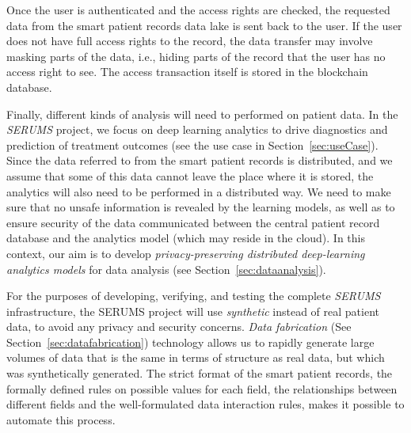 Once the user is authenticated and the access rights are checked, the requested data from the smart patient records data lake is sent back to the user. If the user does not have full access rights to the record, the data transfer may involve masking parts of the data, i.e., hiding parts of the record that the user has no access right to see. The access transaction itself is stored in the blockchain database.

Finally, different kinds of analysis will need to performed on patient data. In the \emph{SERUMS} project, we focus on deep learning analytics to drive diagnostics and prediction of treatment outcomes (see the use case in Section~\ref{sec:useCase}). Since the data referred to from the smart patient records is distributed, and we assume that some of this data cannot leave the place where it is stored, the analytics will also need to be performed in a distributed way. We need to make sure that no unsafe information is revealed by the learning models, as well as to ensure security of the data communicated between the central patient record database and the analytics model (which may reside in the cloud). In this context, our aim is to develop  \emph{privacy-preserving distributed deep-learning analytics models} for data analysis (see Section~\ref{sec:dataanalysis}).


For the purposes of developing, verifying, and testing the complete \emph{SERUMS} infrastructure, the SERUMS project will use \emph{synthetic} instead of real patient data, to avoid any privacy and security concerns. \emph{Data fabrication} (See Section~\ref{sec:datafabrication}) technology allows us to rapidly generate large volumes of data that is the same in terms of structure as real data, but which was synthetically generated. The strict format of the smart patient records, the formally defined rules on possible values for each field, the relationships between different fields and the well-formulated data interaction rules, makes it possible to automate this process. 





